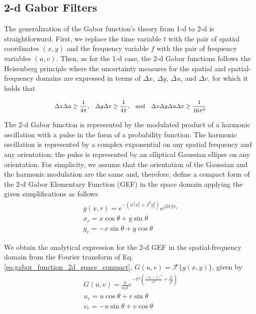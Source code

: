 \documentclass[journal]{IEEEtran}
\begin{document}
\subsection{2-d Gabor Filters}
The generalization of the Gabor function's theory from 1-d to 2-d is straightforward. First, we replace the time variable $t$ with the pair of spatial coordinates $(x, y)$ and the frequency variable $f$ with the pair of frequency variables $(u, v)$. Then, as for the 1-d case, the 2-d Gabor functions follows the Heisenberg principle where the uncertainty measures for the spatial and spatial-frequency domains are expressed in terms of $\Delta x$, $\Delta y$, $\Delta u$, and $\Delta v$, for which it holds that

\begin{equation}\label{eq:uncertainty_principle_2d}
    \begin{gathered}
        \medmath{\Delta x\Delta u \geq \frac{1}{4\pi}\textrm{,} \quad \Delta y\Delta v \geq \frac{1}{4\pi}\textrm{,} \quad \textrm{and}  \quad \Delta x \Delta y \Delta u \Delta v \geq \frac{1}{16\pi^2}}
    \end{gathered}
\end{equation}

The 2-d Gabor function is represented by the modulated product of a harmonic oscillation with a pulse in the form of a probability function. The harmonic oscillation is represented by a complex exponential on any spatial frequency and any orientation; the pulse is represented by an elliptical Gaussian ellipse on any orientation. For simplicity, we assume that the orientation of the Gaussian and the harmonic modulation are the same and, therefore, define a compact form of the 2-d Gabor Elementary Function (GEF) in the space domain applying the given simplifications as follows
\begin{equation}\label{eq:gabor_function_2d_space_compact}
    \begin{gathered}
        g(x, r) =  e ^{-\left(\alpha^2 x_r^2 + \beta^2 y_r^2\right)} e ^{j 2 \pi f x_r } \\
        x_r = x \cos{\theta} + y \sin{\theta}\\
        y_r = -x \sin{\theta} + y \cos{\theta}
     \end{gathered}
\end{equation}

We obtain the analytical expression for the 2-d GEF in the spatial-frequency domain from the Fourier transform of Eq. \eqref{eq:gabor_function_2d_space_compact}, $G(u, v) = \mathcal{F}\{g(x, y)\}$, given by 
\begin{equation}\label{eq:gabor_function_2d_frequency_compact}
    \begin{gathered}
        G(u, v) =  \frac{\pi}{\alpha \beta} e ^{- \pi^2 \left(\frac{\left( u_r - f\right)^2}{\alpha^2} + \frac{v_r^2}{\beta^2}\right)} \\
        u_r = u \cos{\theta} + v \sin{\theta}\\
        v_r = -u \sin{\theta} + v \cos{\theta}
     \end{gathered}
\end{equation}
\end{document}
